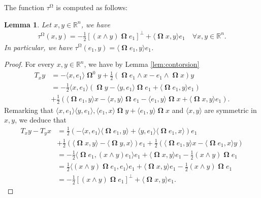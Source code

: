 \documentclass[12pt]{amsart}
\numberwithin{numbering}{section}
\theoremstyle{plain}
\newtheorem{lem}[numbering]{Lemma}
\theoremstyle{definition}
\theoremstyle{remark}
\numberwithin{equation}{section}
\DeclareMathOperator{\oo}{\mathbf{\Omega}}
\DeclareMathOperator{\mg}{\Omega}
\newcommand{\con}[1]{T_{#1}}
\newcommand{\R}{\mathbb{R}}
\begin{document}
The function $\tau^{\mg}$ is computed as follows:
\begin{lem} \label{lem:torsion}
Let $x, y \in \R^n$, we have 
\begin{align}
\tau^{\mg}(x, y) = - \frac{1}{2} [(x \wedge y) \oo e_1 ]^\perp + \langle \oo x, y \rangle e_1 \quad \forall x, y \in \R^n.
\end{align}
In particular, we have $\tau^{\mg}(e_1, y) = \langle \oo e_1, y \rangle e_1$. 
\end{lem}

\begin{proof}
For every $x, y \in \R^n$, we have by Lemma \ref{lem:contorsion}
\begin{align*}
\con{x} y 
&= - \langle x, e_1 \rangle \oo^0 y + \frac{1}{2}(\oo e_1 \wedge x - e_1 \wedge \oo x) y \\
&= - \frac{1}{2} \langle x, e_1 \rangle (\oo y - \langle y, e_1 \rangle \oo e_1 + \langle \oo e_1, y \rangle e_1) \\
&+ \frac{1}{2}(\langle \oo e_1, y \rangle x - \langle x, y \rangle \oo e_1 - \langle e_1, y \rangle \oo x + \langle \oo x, y \rangle e_1).
\end{align*}
Remarking that $\langle x, e_1 \rangle \langle y, e_1 \rangle, \langle e_1, x \rangle \oo y + \langle e_1, y \rangle \oo x$ and $\langle x, y \rangle$ are symmetric in $x, y$, we deduce that 
\begin{align*}
\con{x} y - \con{y} x
&= \frac{1}{2}(- \langle x, e_1 \rangle \langle \oo e_1, y \rangle + \langle y, e_1 \rangle \langle \oo e_1, x \rangle) e_1 \\
&+ \frac{1}{2}( \langle \oo x, y \rangle - \langle \oo y, x \rangle) e_1 + \frac{1}{2} ( \langle \oo e_1, y \rangle x - \langle \oo e_1, x \rangle y) \\
&= - \frac{1}{2} \langle \oo e_1, (x \wedge y) e_1 \rangle e_1 + \langle \oo x, y \rangle e_1 - \frac{1}{2} (x \wedge y) \oo e_1 \\
&= \frac{1}{2} \langle (x \wedge y) \oo e_1, e_1 \rangle e_1 + \langle \oo x, y \rangle e_1 - \frac{1}{2} (x \wedge y) \oo e_1 \\
&= - \frac{1}{2} [(x \wedge y) \oo e_1 ]^\perp + \langle \oo x, y \rangle e_1.
\end{align*}
\end{proof}
\end{document}
